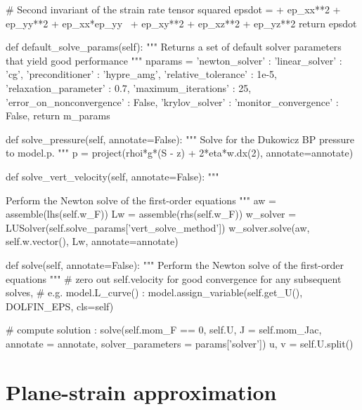 \begin{python}[label=cslvr_first_order, caption={\CSLVR source code contained in the \texttt{MomentumDukowiczBP} class.}]
  # Second invariant of the strain rate tensor squared
  epsdot = + ep_xx**2 + ep_yy**2 + ep_xx*ep_yy \
           + ep_xy**2 + ep_xz**2 + ep_yz**2
  return epsdot

def default_solve_params(self):
  """ 
  Returns a set of default solver parameters that yield good performance
  """
  nparams = {'newton_solver' :
            {
              'linear_solver'            : 'cg',
              'preconditioner'           : 'hypre_amg',
              'relative_tolerance'       : 1e-5,
              'relaxation_parameter'     : 0.7,
              'maximum_iterations'       : 25,
              'error_on_nonconvergence'  : False,
              'krylov_solver'            :
              {
                'monitor_convergence'   : False,
              }
            }}
  return m_params

def solve_pressure(self, annotate=False):
  """
  Solve for the Dukowicz BP pressure to model.p.
  """
  p   = project(rhoi*g*(S - z) + 2*eta*w.dx(2),
                annotate=annotate)


def solve_vert_velocity(self, annotate=False):
  """

  Perform the Newton solve of the first-order equations 
  """
  aw       = assemble(lhs(self.w_F))
  Lw       = assemble(rhs(self.w_F))
  w_solver = LUSolver(self.solve_params['vert_solve_method'])
  w_solver.solve(aw, self.w.vector(), Lw, annotate=annotate)
  
def solve(self, annotate=False):
  """ 
  Perform the Newton solve of the first-order equations 
  """
  # zero out self.velocity for good convergence for any subsequent solves,
  # e.g. model.L_curve() :
  model.assign_variable(self.get_U(), DOLFIN_EPS, cls=self)
  
  # compute solution :
  solve(self.mom_F == 0, self.U, J = self.mom_Jac,
        annotate = annotate, solver_parameters = params['solver'])
  u, v = self.U.split()
\end{python}




\section{Plane-strain approximation} \label{ssn_plane_strain}

